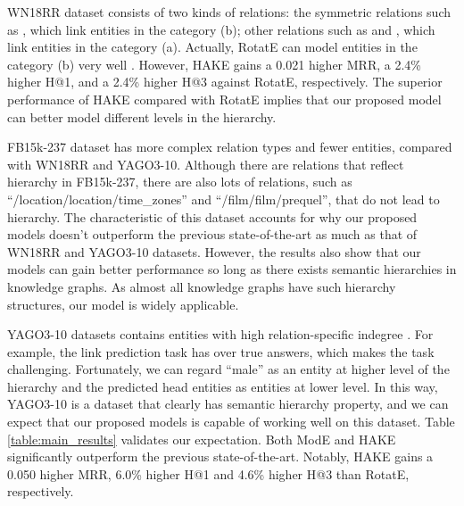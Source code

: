 \documentclass[letterpaper]{article} \usepackage{aaai20}  \usepackage{times}  \usepackage{helvet} \usepackage{courier}  \usepackage[hyphens]{url}  \usepackage{graphicx} \urlstyle{rm} \def\UrlFont{\rm}  \usepackage{graphicx}  \frenchspacing  \setlength{\pdfpagewidth}{8.5in}  \setlength{\pdfpageheight}{11in}
\newcommand{\citep}{\cite}
\begin{document}
\begin{table}[ht]
    \centering
    \caption{Statistics of datasets. The symbols \#E and \#R denote the number of entities and relations, respectively. \#TR, \#VA, and \#TE denote the size of train set, validation set, and test set, respectively.}
    \label{table:datasets}
\end{table}

WN18RR dataset consists of two kinds of relations: the symmetric relations such as , which link entities in the category (b); other relations such as  and , which link entities in the category (a). Actually, RotatE can model entities in the category (b) very well \citep{rotate}. However, HAKE gains a 0.021 higher MRR, a 2.4\% higher H@1, and a 2.4\% higher H@3 against RotatE, respectively. The superior performance of HAKE compared with RotatE implies that our proposed model can better model different levels in the hierarchy.

FB15k-237 dataset has more complex relation types and fewer entities, compared with WN18RR and YAGO3-10. Although there are relations that reflect hierarchy in FB15k-237, there are also lots of relations, such as ``/location/location/time\_zones'' and ``/film/film/prequel'', that do not lead to hierarchy. The characteristic of this dataset accounts for why our proposed models doesn't outperform the previous state-of-the-art as much as that of WN18RR and YAGO3-10 datasets. However, the results also show that our models can gain better performance so long as there exists semantic hierarchies in knowledge graphs. As almost all knowledge graphs have such hierarchy structures, our model is widely applicable.  

YAGO3-10 datasets contains entities with high relation-specific indegree \citep{conve}. For example, the link prediction task  has over  true answers, which makes the task challenging. Fortunately, we can regard ``male'' as an entity at higher level of the hierarchy and the predicted head entities as entities at lower level. In this way, YAGO3-10 is a dataset that clearly has semantic hierarchy property, and we can expect that our proposed models is capable of working well on this dataset. Table \ref{table:main_results} validates our expectation. Both ModE and HAKE significantly outperform the previous state-of-the-art. Notably, HAKE gains a 0.050 higher MRR, 6.0\% higher H@1 and 4.6\% higher H@3 than RotatE, respectively.
\end{document}
